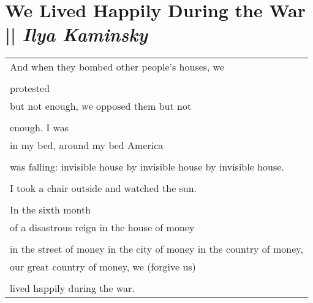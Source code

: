 
\section[We Lived Happily During the War]{We Lived Happily During the War || \emph{Ilya Kaminsky} \hspace*{\fill}  \thepage}
\vspace*{1.5cm}
\begin{center}
\begin{tabular}{l}
And when they bombed other people’s houses, we\\
\\protested\\
but not enough, we opposed them but not\\
\\enough. I was\\
in my bed, around my bed America\\
\\was falling: invisible house by invisible house by invisible house.\\
\\I took a chair outside and watched the sun.\\
\\In the sixth month \\
of a disastrous reign in the house of money\\
\\in the street of money in the city of money in the country of money,\\
our great country of money, we (forgive us)\\
\\lived happily during the war.
\end{tabular}
\end{center}